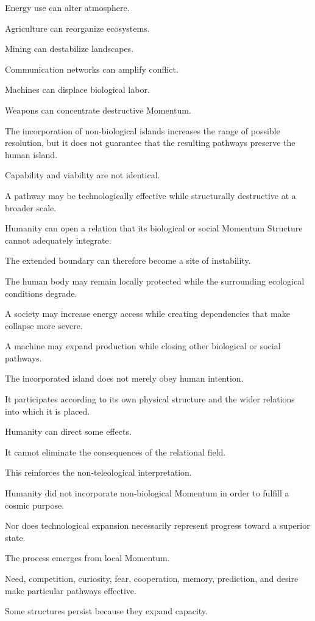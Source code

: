 Energy use can alter atmosphere.

Agriculture can reorganize ecosystems.

Mining can destabilize landscapes.

Communication networks can amplify conflict.

Machines can displace biological labor.

Weapons can concentrate destructive Momentum.

The incorporation of non-biological islands increases the range of possible resolution, but it does not guarantee that the resulting pathways preserve the human island.

Capability and viability are not identical.

A pathway may be technologically effective while structurally destructive at a broader scale.

Humanity can open a relation that its biological or social Momentum Structure cannot adequately integrate.

The extended boundary can therefore become a site of instability.

The human body may remain locally protected while the surrounding ecological conditions degrade.

A society may increase energy access while creating dependencies that make collapse more severe.

A machine may expand production while closing other biological or social pathways.

The incorporated island does not merely obey human intention.

It participates according to its own physical structure and the wider relations into which it is placed.

Humanity can direct some effects.

It cannot eliminate the consequences of the relational field.

This reinforces the non-teleological interpretation.

Humanity did not incorporate non-biological Momentum in order to fulfill a cosmic purpose.

Nor does technological expansion necessarily represent progress toward a superior state.

The process emerges from local Momentum.

Need, competition, curiosity, fear, cooperation, memory, prediction, and desire make particular pathways effective.

Some structures persist because they expand capacity.

